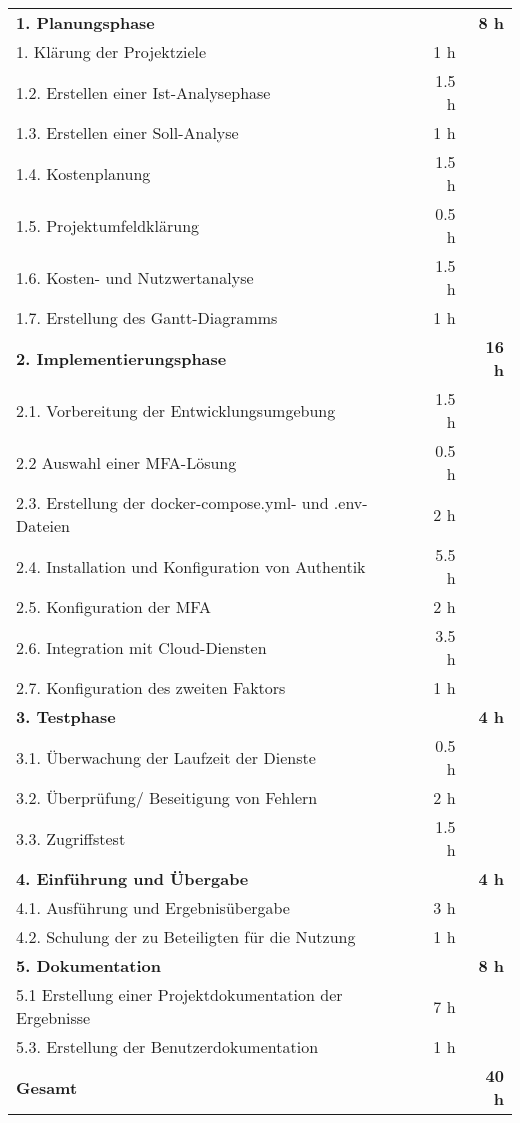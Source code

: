 \begin{tabularx}{\textwidth}{Xrrr}
\rowcolor{heading}\textbf{1. Planungsphase} & \textbf{} & \textbf{} & \textbf{8 h} \\
1. Klärung der Projektziele &       &   1 h   &  \\
\rowcolor{odd}1.2. Erstellen einer Ist-Analysephase &       &    1.5 h   &  \\
1.3. Erstellen einer Soll-Analyse &       &    1 h    &  \\
\rowcolor{odd}1.4. Kostenplanung &       &   1.5 h   &  \\
1.5. Projektumfeldklärung &       &    0.5 h   &  \\
\rowcolor{odd}1.6. Kosten- und Nutzwertanalyse &       &    1.5 h   &  \\
1.7. Erstellung des Gantt-Diagramms &        &    1 h     &   \\
\rowcolor{heading}\textbf{2. Implementierungsphase} & \textbf{} & \textbf{} & \textbf{16 h} \\
2.1. Vorbereitung der Entwicklungsumgebung &       &    1.5 h   &  \\
\rowcolor{odd}2.2 Auswahl einer \acs{MFA}-Lösung  &       &    0.5 h   &  \\
2.3. Erstellung der docker-compose.yml- und .env-Dateien &       &   2 h    &  \\
\rowcolor{odd}2.4. Installation und Konfiguration von Authentik &      &   5.5 h    &  \\
2.5. Konfiguration der \acs{MFA} &       &   2 h   &  \\
\rowcolor{odd}2.6. Integration mit Cloud-Diensten &     &   3.5 h    &  \\
2.7. Konfiguration des zweiten Faktors &       &    1 h    &   \\
\rowcolor{heading}\textbf{3. Testphase} & \textbf{} & \textbf{} & \textbf{4 h} \\
3.1. Überwachung der Laufzeit der Dienste &       &    0.5 h    &  \\
\rowcolor{odd}3.2. Überprüfung/ Beseitigung von Fehlern &       &    2 h   &  \\
3.3. Zugriffstest &        &    1.5 h   &    \\
\rowcolor{heading}\textbf{4. Einführung und Übergabe} & \textbf{} & \textbf{} & \textbf{4 h} \\
4.1. Ausführung und Ergebnisübergabe &       &    3 h   &  \\
\rowcolor{odd}4.2. Schulung der zu Beteiligten für die Nutzung &      &   1 h   &    \\
\rowcolor{heading}\textbf{5. Dokumentation} & \textbf{} & \textbf{} & \textbf{8 h} \\
5.1 Erstellung einer Projektdokumentation der Ergebnisse &       &   7 h   &  \\
\rowcolor{odd}5.3. Erstellung der Benutzerdokumentation &       &    1 h   &    \\
\hline
\hline
\rowcolor{heading}\textbf{Gesamt} & \textbf{} & \textbf{} & \textbf{40 h} \\
\end{tabularx}
